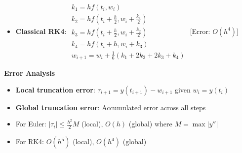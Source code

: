\documentclass{article}
\begin{document}
\begin{minipage}[t]{0.49\textwidth}
\begin{itemize}
\item \textbf{Classical RK4}:
$\begin{array}{l}
k_1 = hf(t_i,w_i) \\
k_2 = hf(t_i+\frac{h}{2},w_i+\frac{k_1}{2}) \\
k_3 = hf(t_i+\frac{h}{2},w_i+\frac{k_2}{2}) \\
k_4 = hf(t_i+h,w_i+k_3) \\
w_{i+1} = w_i + \frac{1}{6}(k_1 + 2k_2 + 2k_3 + k_4)
\end{array}$
[Error: $O(h^4)$]
\end{itemize}

\textbf{Error Analysis}
\begin{itemize}
\item \textbf{Local truncation error}: $\tau_{i+1} = y(t_{i+1}) - w_{i+1}$ given $w_i = y(t_i)$
\item \textbf{Global truncation error}: Accumulated error across all steps
\item For Euler: $|\tau_i| \leq \frac{h^2}{2}M$ (local), $O(h)$ (global) where $M = \max|y''|$
\item For RK4: $O(h^5)$ (local), $O(h^4)$ (global)
\end{itemize}

\end{minipage}
\hfill
\end{document}
